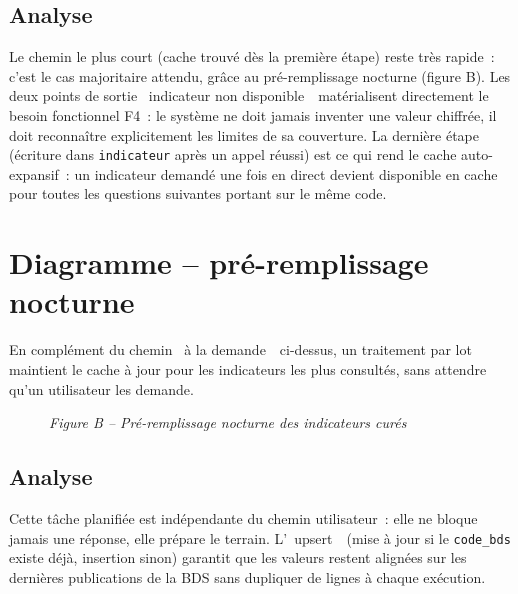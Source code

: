 \documentclass[11pt,a4paper]{article}
\begin{document}
\subsection*{Analyse}
Le chemin le plus court (cache trouv\'e d\`es la premi\`ere \'etape) reste tr\`es rapide~: c'est le cas majoritaire attendu, gr\^ace au pr\'e-remplissage nocturne (figure B). Les deux points de sortie \guillemotleft~indicateur non disponible~\guillemotright\ mat\'erialisent directement le besoin fonctionnel F4~: le syst\`eme ne doit jamais inventer une valeur chiffr\'ee, il doit reconna\^itre explicitement les limites de sa couverture. La derni\`ere \'etape (\'ecriture dans \texttt{indicateur} apr\`es un appel r\'eussi) est ce qui rend le cache auto-expansif~: un indicateur demand\'e une fois en direct devient disponible en cache pour toutes les questions suivantes portant sur le m\^eme code.

\section{Diagramme -- pr\'e-remplissage nocturne}
En compl\'ement du chemin \guillemotleft~\`a la demande~\guillemotright\ ci-dessus, un traitement par lot maintient le cache \`a jour pour les indicateurs les plus consult\'es, sans attendre qu'un utilisateur les demande.

\begin{figure}[h!]
\centering
{}
\par\vspace{4pt}
{\small\color{greytext}\itshape Figure B -- Pr\'e-remplissage nocturne des indicateurs cur\'es}
\end{figure}

\subsection*{Analyse}
Cette t\^ache planifi\'ee est ind\'ependante du chemin utilisateur~: elle ne bloque jamais une r\'eponse, elle pr\'epare le terrain. L'\guillemotleft~upsert~\guillemotright\ (mise \`a jour si le \texttt{code\_bds} existe d\'ej\`a, insertion sinon) garantit que les valeurs restent align\'ees sur les derni\`eres publications de la BDS sans dupliquer de lignes \`a chaque ex\'ecution.
\end{document}
